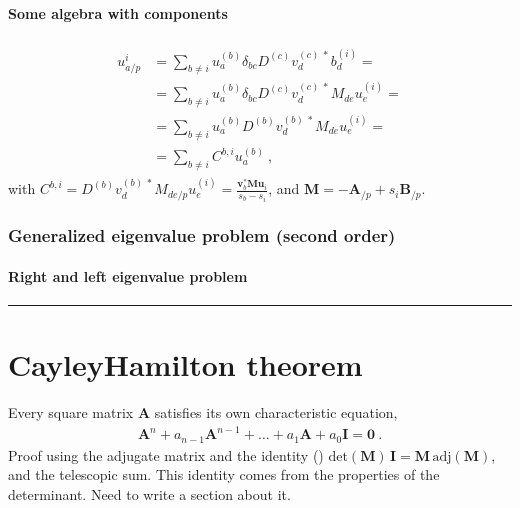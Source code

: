 \documentclass[letterpaper,10pt,english]{jupyterBook}
\begin{document}
\subsubsection*{Some algebra with components}
\begin{equation*}
\begin{split}\begin{aligned}
  u^{i}_{a/p}
  & = \sum_{b \ne i} u_{a}^{(b)} \delta_{bc} D^{(c)} v^{(c) \ *}_d b^{(i)}_d = \\
  & = \sum_{b \ne i} u_{a}^{(b)} \delta_{bc} D^{(c)} v^{(c) \ *}_d M_{de} u^{(i)}_e = \\
  & = \sum_{b \ne i} u_{a}^{(b)} D^{(b)} v^{(b) \ *}_d M_{de} u^{(i)}_e = \\
  & = \sum_{b \ne i} C^{b,i} u_{a}^{(b)} \ ,
\end{aligned}\end{split}
\end{equation*}
\sphinxAtStartPar
with \(C^{b,i} = D^{(b)} v^{(b) \ *}_d M_{de/p} u^{(i)}_e = \frac{\mathbf{v}^*_b \mathbf{M} \mathbf{u}_i}{s_b - s_i}\), and \(\mathbf{M} = - \mathbf{A}_{/p} + s_i \mathbf{B}_{/p}\).


\subsection{Generalized eigenvalue problem (second order)}
\label{\detokenize{ch/linear-algebra/spectral-sensitivity:generalized-eigenvalue-problem-second-order}}\label{\detokenize{ch/linear-algebra/spectral-sensitivity:math-spectral-sensitivity-second-order}}

\subsubsection{Right and left eigenvalue problem}
\label{\detokenize{ch/linear-algebra/spectral-sensitivity:id3}}

\bigskip\hrule\bigskip


\sphinxstepscope


\chapter{Cayley\sphinxhyphen{}Hamilton theorem}
\label{\detokenize{ch/linear-algebra/cayley-hamilton:cayley-hamilton-theorem}}\label{\detokenize{ch/linear-algebra/cayley-hamilton:cayley-hamilton}}\label{\detokenize{ch/linear-algebra/cayley-hamilton::doc}}
\sphinxAtStartPar
Every square matrix \(\mathbf{A}\) satisfies its own characteristic equation,
\begin{equation*}
\begin{split}\mathbf{A}^n + a_{n-1} \mathbf{A}^{n-1} + \dots + a_1 \mathbf{A} + a_0 \mathbf{I} = \mathbf{0} \ .\end{split}
\end{equation*}
\sphinxAtStartPar
{} Proof using the adjugate matrix and the identity () \( \text{det}(\mathbf{M}) \, \mathbf{I}= \mathbf{M} \, \text{adj}(\mathbf{M})\), and the telescopic sum. This identity comes from the properties of the determinant. Need to write a section about it.
\end{document}
